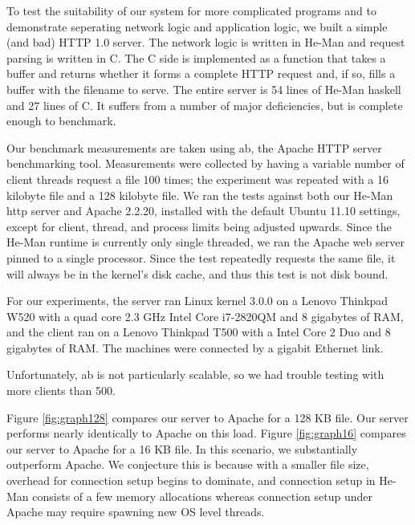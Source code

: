 \documentclass[preprint,11pt]{sigplanconf}
\begin{document}
To test the suitability of our system for more complicated programs
and to demonstrate seperating network logic and application logic, we
built a simple (and bad) HTTP 1.0 server. The network logic is written
in He-Man and request parsing is written in C. The C side is
implemented as a function that takes a buffer and returns whether it
forms a complete HTTP request and, if so, fills a buffer with the
filename to serve. The entire server is 54 lines of He-Man haskell and
27 lines of C. It suffers from a number of major deficiencies, but is
complete enough to benchmark.

Our benchmark measurements are taken using ab, the Apache HTTP server
benchmarking tool. \cite{ApacheAB} Measurements were collected by
having a variable number of client threads request a file 100 times;
the experiment was repeated with a 16 kilobyte file and a 128 kilobyte
file. We ran the tests against both our He-Man http server and Apache
2.2.20, installed with the default Ubuntu 11.10 settings, except for
client, thread, and process limits being adjusted upwards. Since the
He-Man runtime is currently only single threaded, we ran the Apache
web server pinned to a single processor. Since the test repeatedly
requests the same file, it will always be in the kernel's disk cache,
and thus this test is not disk bound.

For our experiments, the server ran Linux kernel 3.0.0 on a Lenovo
Thinkpad W520 with a quad core 2.3 GHz Intel Core i7-2820QM and 8
gigabytes of RAM, and the client ran on a Lenovo Thinkpad T500 with a
Intel Core 2 Duo and 8 gigabytes of RAM.  %
The machines were connected by a gigabit Ethernet link.

Unfortunately, ab is not particularly scalable, so we had trouble
testing with more clients than 500.

Figure \ref{fig:graph128} compares our server to Apache for a 128 KB
file. Our server performs nearly identically to Apache on this load.
Figure \ref{fig:graph16} compares our server to Apache for a 16 KB
file. In this scenario, we substantially outperform Apache. We
conjecture this is because with a smaller file size, overhead for
connection setup begins to dominate, and connection setup in He-Man
consists of a few memory allocations whereas connection setup under
Apache may require spawning new OS level threads.
\end{document}
